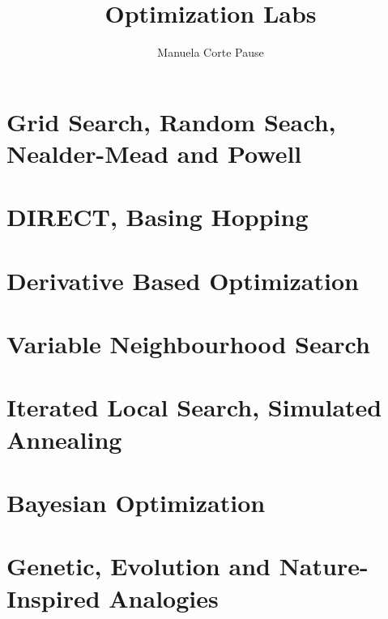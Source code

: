 \documentclass{article}
\title{Optimization Labs}
\author{Manuela Corte Pause}
\begin{document}
\maketitle

\tableofcontents
\newpage

\section{Grid Search, Random Seach, Nealder-Mead and Powell}

\newpage

\section{DIRECT, Basing Hopping}

\newpage

\section{Derivative Based Optimization}

\newpage

\section{Variable Neighbourhood Search}

\newpage

\section{Iterated Local Search, Simulated Annealing}

\newpage

\section{Bayesian Optimization}

\newpage

\section{Genetic, Evolution and Nature-Inspired Analogies}

\newpage
\end{document}
